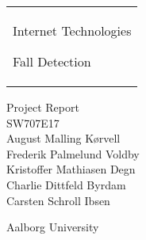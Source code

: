 %
\begin{titlepage}
    \addtolength{\hoffset}{0.5\evensidemargin-0.5\oddsidemargin} %
    \noindent%
    \begin{tabular}{@{}p{\textwidth}@{}}
        \vspace{0.2cm}
        \begin{center}
            \LARGE{
            Internet Technologies
            }
        \end{center}
        \begin{center}
            \Large{
                Fall Detection%
            }
        \end{center}
        \vspace{0.2cm}\\

    \end{tabular}
    \vspace{2 cm}
    \begin{center}
        {\large
            Project Report%
        }\\
        \vspace{0.2cm}
        {\Large
            SW707E17 \\%
            August Malling Kørvell\\
            Frederik Palmelund Voldby\\
            Kristoffer Mathiasen Degn\\
            Charlie Dittfeld Byrdam\\
            Carsten Schroll Ibsen\\
        }
    \end{center}
    \vfill
    \begin{center}
        Aalborg University\\
    \end{center}
\end{titlepage}
\clearpage
